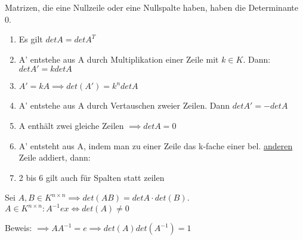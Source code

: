 \documentclass{../tudscript}
\begin{document}
Matrizen, die eine Nullzeile oder eine Nullspalte haben, haben die Determinante 0.

\begin{enumerate}
    \item Es gilt $det A = det A^T$

    \item A' entstehe aus A durch Multiplikation einer Zeile mit $k \in K$. Dann: $det A' = k det A$
    
    \item $A' = kA \implies det (A') = k^n det A$

    \item A' entstehe aus A durch Vertauschen zweier Zeilen. Dann $det A' = - det A$
    
    \item A enthält zwei gleiche Zeilen $\implies det A = 0$

    \item A' entsteht aus A, indem man zu einer Zeile das k-fache einer bel. \underline{anderen} Zeile addiert, dann:
    
    \item 2 bis 6 gilt auch für Spalten statt zeilen
\end{enumerate}
Sei $A, B \in K^{n \times n} \implies det(AB) = det A \cdot det(B)$.
$A \in K^{n \times n}: \boxed{A^{-1} ex \iff det (A) \neq 0}$

Beweis: $\implies A A^{-1} = e \implies det (A) det (A^{-1}) = 1$
\end{document}
